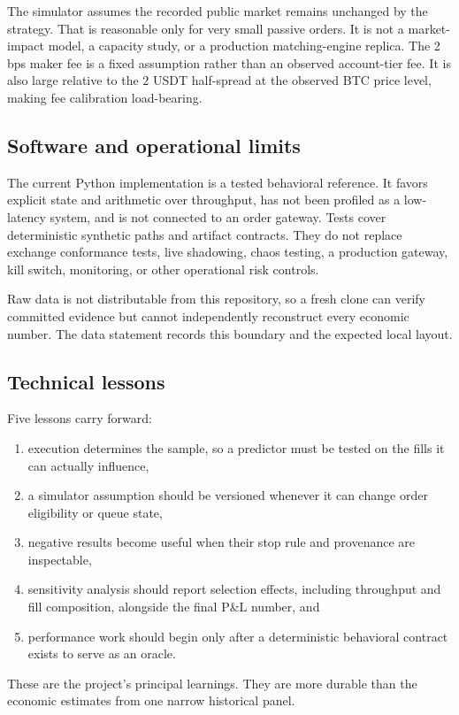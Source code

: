The simulator assumes the recorded public market remains unchanged by the
strategy. That is reasonable only for very small passive orders. It is not a
market-impact model, a capacity study, or a production matching-engine replica.
The 2 bps maker fee is a fixed assumption rather than an observed account-tier
fee. It is also large relative to the 2 USDT half-spread at the observed BTC
price level, making fee calibration load-bearing.

\subsection{Software and operational limits}

The current Python implementation is a tested behavioral reference. It favors
explicit state and  arithmetic over throughput, has not been
profiled as a low-latency system, and is not connected to an order gateway.
Tests cover deterministic synthetic paths and artifact contracts. They do not
replace exchange conformance tests, live shadowing, chaos testing, a production
gateway, kill switch, monitoring, or other operational risk controls.

Raw data is not distributable from this repository, so a fresh clone can verify
committed evidence but cannot independently reconstruct every economic number.
The data statement records this boundary and the expected local layout.

\subsection{Technical lessons}

Five lessons carry forward:

\begin{enumerate}
  \item execution determines the sample, so a predictor must be tested on the
        fills it can actually influence,
  \item a simulator assumption should be versioned whenever it can change order
        eligibility or queue state,
  \item negative results become useful when their stop rule and provenance are
        inspectable,
  \item sensitivity analysis should report selection effects, including throughput and
        fill composition, alongside the final P\&L number, and
  \item performance work should begin only after a deterministic behavioral
        contract exists to serve as an oracle.
\end{enumerate}

These are the project's principal learnings. They are more durable than the
economic estimates from one narrow historical panel.
